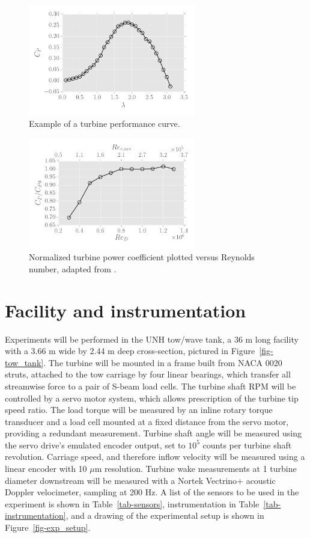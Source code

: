 \documentclass[12pt,letterpaper]{scrreprt}
\begin{document}
\begin{figure}[ht]
\centering
\includegraphics[width=0.65\textwidth]{Figures/cp_vs_tsr.pdf}
\caption{Example of a turbine performance curve.}
\label{fig-cp}
\end{figure}

\begin{figure}[ht]
\centering
\includegraphics[width=0.65\textwidth]{Figures/re_dep_cp.pdf}
\caption{Normalized turbine power coefficient plotted versus Reynolds number, adapted from \cite{Bachant2014}.}
\label{fig-cp_re_dep}
\end{figure}

\section{Facility and instrumentation}

Experiments will be performed in the UNH tow/wave tank, a 36 m long facility
with a 3.66 m wide by 2.44 m deep cross-section, pictured in
Figure~\ref{fig-tow_tank}. The turbine will be mounted in a frame built from
NACA 0020 struts, attached to the tow carriage by four linear bearings, which
transfer all streamwise force to a pair of S-beam load cells. The turbine shaft
RPM will be controlled by a servo motor system, which allows prescription of the
turbine tip speed ratio. The load torque will be measured by an inline rotary
torque transducer and a load cell mounted at a fixed distance from the servo
motor, providing a redundant measurement. Turbine shaft angle will be measured
using the servo drive's emulated encoder output, set to $10^5$ counts per
turbine shaft revolution. Carriage speed, and therefore inflow velocity will be
measured using a linear encoder with 10 $\mu$m resolution. Turbine wake
measurements at 1 turbine diameter downstream will be measured with a Nortek
Vectrino+ acoustic Doppler velocimeter, sampling at 200 Hz. A list of the
sensors to be used in the experiment is shown in Table~\ref{tab-sensors},
instrumentation in Table~\ref{tab-instrumentation}, and a drawing of the
experimental setup is shown in Figure~\ref{fig-exp_setup}.
\end{document}
